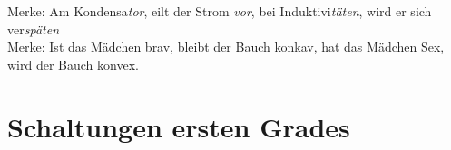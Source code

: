 \documentclass[fs, footer]{latex4ei}
\begin{document}
\begin{multicols*}{4}
Merke: Am Kondensa\textsl{tor}, eilt der Strom \textsl{vor}, bei Induktivi\textsl{täten}, wird er sich ver\textsl{späten}\\
Merke: Ist das Mädchen brav, bleibt der Bauch konkav, hat das Mädchen Sex, wird der Bauch konvex.\\
\section{Schaltungen ersten Grades}
\end{multicols*}
\end{document}
